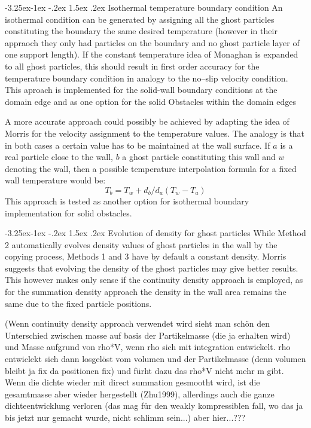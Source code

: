 \documentclass{report}
\makeatletter
\renewcommand\paragraph{\@startsection{paragraph}{4}{\z@}%
  {-3.25ex\@plus -1ex \@minus -.2ex}%
  {1.5ex \@plus .2ex}%
  {\normalfont\normalsize\bfseries}}
\makeatother
\begin{document}
\paragraph{Isothermal temperature boundary condition}
\label{sec:BC_solid_Wall_isothermal}
An isothermal condition can be generated by assigning all the ghost particles constituting the boundary the same desired temperature \cite{Cleary1999} (however in their appraoch they only had particles on the boundary and no ghost particle layer of one support length). If the constant temperature idea of Monaghan is expanded to all ghost particles, this should result in first order accuracy for the temperature boundary condition in analogy to the no--slip velocity condition. This aproach is implemented for the solid-wall boundary conditions at the domain edge and as one option for the solid Obstacles within the domain edges

A more accurate approach could possibly be achieved by adapting the idea of Morris for the velocity assignment \cite{Morris1997, Zhu1999} to the temperature values. The analogy is that in both cases a certain value has to be maintained at the wall surface. If $a$ is a real particle close to the wall, $b$ a ghost particle constituting this wall and $w$ denoting the wall, then a possible temperature interpolation formula for a fixed wall temperature would be: %
\begin{equation}
 \label{eq:IsothermalBC_T_extrapolation}
T_b=T_w+d_b/d_a(T_w-T_a)
\end{equation}
This approach is tested as another option for isothermal boundary implementation for solid obstacles.


\paragraph{Evolution of density for ghost particles}
While Method 2 automatically evolves density values of ghost particles in the wall by the copying process, Methods 1 and 3 have by default a constant density. Morris \cite{Morris1997, Zhu1999} suggests that evolving the density of the ghost particles may give better results. This however makes only sense if the continuity density approach is employed, as for the summation density approach the density in the wall area remains the same due to the fixed particle positions. 

(Wenn continuity density approach verwendet wird sieht man schön den Unterschied zwischen masse auf basis der Partikelmasse (die ja erhalten wird) und Masse aufgrund von rho*V, wenn rho sich mit integration entwickelt. rho entwiclekt sich dann losgelöst vom volumen und der Partikelmasse (denn volumen bleibt ja fix da positionen fix)
und fürht dazu das rho*V nicht mehr m gibt. Wenn die dichte wieder mit direct summation gesmootht wird, ist die gesamtmasse aber wieder hergestellt (Zhu1999), allerdings auch die ganze dichteentwicklung verloren (das mag für den weakly kompressiblen fall, wo das ja bis jetzt nur gemacht wurde,  nicht schlimm sein...) aber hier...???
\end{document}
